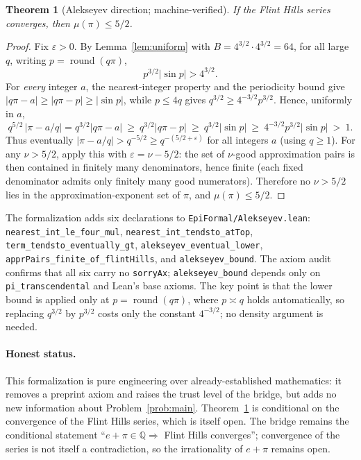 \documentclass[11pt]{amsart}
\newtheorem{theorem}{Theorem}[section]
\theoremstyle{definition}
\theoremstyle{remark}
\numberwithin{equation}{section}
\newcommand{\Q}{\mathbb{Q}}
\newcommand{\irr}{\mu}
\begin{document}
\begin{theorem}[Alekseyev direction; machine-verified]\label{thm:alekseyev-bound} If the Flint Hills series converges, then $\irr(\pi)\le5/2$.
\end{theorem}
\begin{proof} Fix $\varepsilon>0$. By Lemma~\ref{lem:uniform} with $B=4^{3/2}\cdot4^{3/2}=64$, for all large $q$, writing $p=\operatorname{round}(q\pi)$,
\[
p^{3/2}|\sin p|>4^{3/2}.
\]
For \emph{every} integer $a$, the nearest-integer property and the periodicity bound give $|q\pi-a|\ge|q\pi-p|\ge|\sin p|$, while $p\le4q$ gives $q^{3/2}\ge4^{-3/2}p^{3/2}$. Hence, uniformly in $a$,
\[
q^{5/2}\,|\pi-a/q|=q^{3/2}|q\pi-a|\ \ge\ q^{3/2}|q\pi-p|\ \ge\ q^{3/2}|\sin p|\ \ge\ 4^{-3/2}p^{3/2}|\sin p|\ >\ 1.
\]
Thus eventually $|\pi-a/q|>q^{-5/2}\ge q^{-(5/2+\varepsilon)}$ for all integers $a$ (using $q\ge1$). For any $\nu>5/2$, apply this with $\varepsilon=\nu-5/2$: the set of $\nu$-good approximation pairs is then contained in finitely many denominators, hence finite (each fixed denominator admits only finitely many good numerators). Therefore no $\nu>5/2$ lies in the approximation-exponent set of $\pi$, and $\irr(\pi)\le5/2$.
\end{proof}

The formalization adds six declarations to \texttt{EpiFormal/\allowbreak{}Alekseyev.lean}: \texttt{nearest\_\allowbreak{}int\_\allowbreak{}le\_\allowbreak{}four\_\allowbreak{}mul}, \texttt{nearest\_\allowbreak{}int\_\allowbreak{}tendsto\_\allowbreak{}atTop}, \texttt{term\_\allowbreak{}tendsto\_\allowbreak{}eventually\_\allowbreak{}gt}, \texttt{alekseyev\_\allowbreak{}eventual\_\allowbreak{}lower}, \texttt{apprPairs\_\allowbreak{}finite\_\allowbreak{}of\_\allowbreak{}flintHills}, and \texttt{alekseyev\_\allowbreak{}bound}. The axiom audit confirms that all six carry no \texttt{sorryAx}; \texttt{alekseyev\_\allowbreak{}bound} depends only on \texttt{pi\_transcendental} and Lean's base axioms. The key point is that the lower bound is applied only at $p=\operatorname{round}(q\pi)$, where $p\asymp q$ holds automatically, so replacing $q^{3/2}$ by $p^{3/2}$ costs only the constant $4^{-3/2}$; no density argument is needed.

\paragraph{Honest status.} This formalization is pure engineering over already-established mathematics: it removes a preprint axiom and raises the trust level of the bridge, but adds no new information about Problem~\ref{prob:main}. Theorem~\ref{thm:alekseyev-bound} is conditional on the convergence of the Flint Hills series, which is itself open. The bridge remains the conditional statement ``$e+\pi\in\Q\Rightarrow$ Flint Hills converges''; convergence of the series is not itself a contradiction, so the irrationality of $e+\pi$ remains open.
\end{document}
